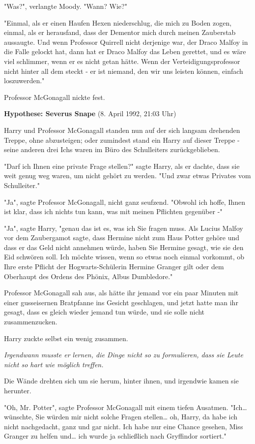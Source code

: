 {"Was?", verlangte Moody. "Wann? Wie?"

"Einmal, als er einen Haufen Hexen niederschlug, die mich zu Boden zogen, einmal, als er herausfand, dass der Dementor mich durch meinen Zauberstab aussaugte. Und wenn Professor Quirrell nicht derjenige war, der Draco Malfoy in die Falle gelockt hat, dann hat er Draco Malfoy das Leben gerettet, und es wäre viel schlimmer, wenn er es nicht getan hätte. Wenn der Verteidigungsprofessor nicht hinter all dem steckt - er ist niemand, den wir uns leisten können, einfach loszuwerden."

Professor McGonagall nickte fest.

\textbf{Hypothese: Severus Snape} (8. April 1992, 21:03 Uhr)

Harry und Professor McGonagall standen nun auf der sich langsam drehenden Treppe, ohne abzusteigen; oder zumindest stand ein Harry auf dieser Treppe - seine anderen drei Ichs waren im Büro des Schulleiters zurückgeblieben.

"Darf ich Ihnen eine private Frage stellen?" sagte Harry, als er dachte, dass sie weit genug weg waren, um nicht gehört zu werden. "Und zwar etwas Privates vom Schulleiter."

"Ja", sagte Professor McGonagall, nicht ganz seufzend. "Obwohl ich hoffe, Ihnen ist klar, dass ich nichts tun kann, was mit meinen Pflichten gegenüber -"

"Ja", sagte Harry, "genau das ist es, was ich Sie fragen muss. Als Lucius Malfoy vor dem Zaubergamot sagte, dass Hermine nicht zum Haus Potter gehöre und dass er das Geld nicht annehmen würde, haben Sie Hermine gesagt, wie sie den Eid schwören soll. Ich möchte wissen, wenn so etwas noch einmal vorkommt, ob Ihre erste Pflicht der Hogwarts-Schülerin Hermine Granger gilt oder dem Oberhaupt des Ordens des Phönix, Albus Dumbledore."

Professor McGonagall sah aus, als hätte ihr jemand vor ein paar Minuten mit einer gusseisernen Bratpfanne ins Gesicht geschlagen, und jetzt hatte man ihr gesagt, dass es gleich wieder jemand tun würde, und sie solle nicht zusammenzucken.

Harry zuckte selbst ein wenig zusammen.

\emph{Irgendwann musste er lernen, die Dinge nicht so zu formulieren, dass sie Leute nicht so hart wie möglich treffen.}

Die Wände drehten sich um sie herum, hinter ihnen, und irgendwie kamen sie herunter.

"Oh, Mr. Potter", sagte Professor McGonagall mit einem tiefen Ausatmen. "Ich… wünschte, Sie würden mir nicht solche Fragen stellen… oh, Harry, da habe ich nicht nachgedacht, ganz und gar nicht. Ich habe nur eine Chance gesehen, Miss Granger zu helfen und… ich wurde ja schließlich nach Gryffindor sortiert."

}
